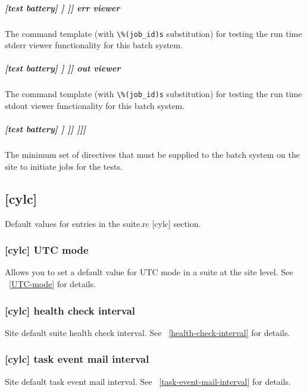 \subparagraph[err viewer]{[test battery] \textrightarrow [[batch systems]] \textrightarrow [[[SYSTEM]]] \textrightarrow err viewer}

The command template (with \lstinline=\%(job_id)s= substitution) for testing
the run time stderr viewer functionality for this batch system.

\subparagraph[out viewer]{[test battery] \textrightarrow [[batch systems]] \textrightarrow [[[SYSTEM]]] \textrightarrow out viewer}

The command template (with \lstinline=\%(job_id)s= substitution) for testing
the run time stdout viewer functionality for this batch system.

\subparagraph[{[[[[}directives{]]]]}]{[test battery] \textrightarrow [[batch systems]] \textrightarrow [[[SYSTEM]]] \textrightarrow [[[[directives]]]]}

The minimum set of directives that must be supplied to the batch system on the
site to initiate jobs for the tests.

\subsection{[cylc]}

Default values for entries in the suite.rc [cylc] section.

\subsubsection[UTC mode]{[cylc] \textrightarrow UTC mode}
\label{SiteUTCMode}

Allows you to set a default value for UTC mode in a suite at the site level.
See ~\ref{UTC-mode} for details.

\subsubsection[health check interval]{[cylc] \textrightarrow health check interval}

Site default suite health check interval.
See ~\ref{health-check-interval} for details.

\subsubsection[task event mail interval]{[cylc] \textrightarrow task event mail interval}

Site default task event mail interval.
See ~\ref{task-event-mail-interval} for details.

